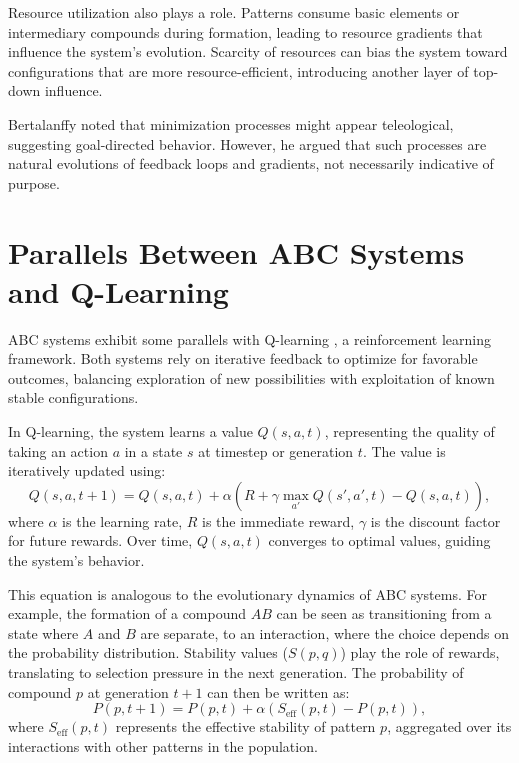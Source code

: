 \documentclass[entropy,article,submit,pdftex,moreauthors]{Definitions/mdpi}
\begin{document}
Resource utilization also plays a role. Patterns consume basic elements or intermediary compounds during formation, leading to resource gradients that influence the system's evolution. Scarcity of resources can bias the system toward configurations that are more resource-efficient, introducing another layer of top-down influence.

Bertalanffy \cite{bertalanffy1968general} noted that minimization processes might appear teleological, suggesting goal-directed behavior. However, he argued that such processes are natural evolutions of feedback loops and gradients, not necessarily indicative of purpose.

\section{Parallels Between ABC Systems and Q-Learning}

ABC systems exhibit some parallels with Q-learning \cite{sutton2018reinforce}, a reinforcement learning framework. Both systems rely on iterative feedback to optimize for favorable outcomes, balancing exploration of new possibilities with exploitation of known stable configurations.

In Q-learning, the system learns a value \( Q(s, a, t) \), representing the quality of taking an action \( a \) in a state \( s \) at timestep or generation \( t \). The value is iteratively updated using:
\[
Q(s, a, t+1) = Q(s, a, t) + \alpha \left( R + \gamma \max_{a'} Q(s', a', t) - Q(s, a, t) \right),
\]
where \( \alpha \) is the learning rate, \( R \) is the immediate reward, \( \gamma \) is the discount factor for future rewards. Over time, \( Q(s, a, t) \) converges to optimal values, guiding the system's behavior.

This equation is analogous to the evolutionary dynamics of ABC systems. For example, the formation of a compound \( AB \) can be seen as transitioning from a state where \( A \) and \( B \) are separate, to an interaction, where the choice depends on the probability distribution. Stability values (\( S(p, q) \)) play the role of rewards, translating to selection pressure in the next generation. The probability of compound \( p \) at generation \( t+1 \) can then be written as:
\[
P(p, t+1) = P(p, t) + \alpha \left( S_{\text{eff}}(p, t) - P(p, t) \right),
\]
where \( S_{\text{eff}}(p, t) \) represents the effective stability of pattern \( p \), aggregated over its interactions with other patterns in the population.
\end{document}
